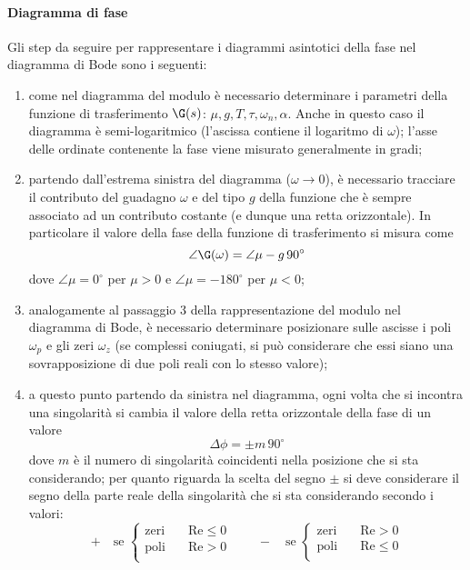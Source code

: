 			\paragraph{Diagramma di fase} Gli step da seguire per rappresentare i diagrammi asintotici della fase nel diagramma di Bode sono i seguenti:
			\begin{enumerate}
				\item come nel diagramma del modulo è necessario determinare i parametri della funzione di trasferimento $\G(s)$: $\mu, g, T, \tau, \omega_n, \alpha$. Anche in questo caso il diagramma è semi-logaritmico (l'ascissa contiene il logaritmo di $\omega$); l'asse delle ordinate contenente la fase viene misurato generalmente in gradi;
				
				\item partendo dall'estrema sinistra del diagramma ($\omega\rightarrow 0$), è necessario tracciare il contributo del guadagno $\omega$ e del tipo $g$ della funzione che è sempre associato ad un contributo costante (e dunque una retta orizzontale). In particolare il valore della fase della funzione di trasferimento si misura come
				\[ \angle \G(\omega) = \angle \mu - g \, 90^\circ \]
				dove $\angle \mu = 0^\circ$ per $\mu > 0 $ e $\angle \mu = -180^\circ$ per $\mu < 0$;
				
				\item analogamente al passaggio 3 della rappresentazione del modulo nel diagramma di Bode, è necessario determinare posizionare sulle ascisse i poli $\omega_p$ e gli zeri $\omega_z$ (se complessi coniugati, si può considerare che essi siano una sovrapposizione di due poli reali con lo stesso valore);
				
				\item a questo punto partendo da sinistra nel diagramma, ogni volta che si incontra una singolarità si cambia il valore della retta orizzontale della fase di un valore
				\[  \Delta \phi = \pm m \, 90^\circ \]
				dove $m$ è il numero di singolarità coincidenti nella posizione che si sta considerando; per quanto riguarda la scelta  del segno $\pm$ si deve considerare il segno della parte reale della singolarità che si sta considerando secondo i valori:
				\[ + \quad \textrm{se } \begin{cases}
					\textrm{zeri} \quad & \textrm{Re} \leq 0 \\
					\textrm{poli} \quad & \textrm{Re} > 0 \\
				\end{cases} \qquad - \quad \textrm{se } \begin{cases}
					\textrm{zeri} \quad & \textrm{Re} > 0 \\
					\textrm{poli} \quad & \textrm{Re} \leq 0 \\
				\end{cases} \]
			\end{enumerate}
			
